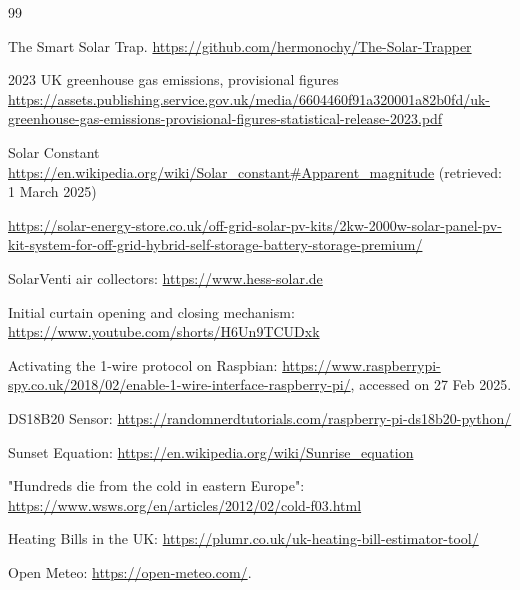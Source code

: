 \documentclass[a4paper,12pt]{article}
\begin{document}
\begin{thebibliography}{99}

     The Smart Solar Trap. \url{https://github.com/hermonochy/The-Solar-Trapper}

     2023 UK greenhouse gas emissions, provisional figures \url{https://assets.publishing.service.gov.uk/media/6604460f91a320001a82b0fd/uk-greenhouse-gas-emissions-provisional-figures-statistical-release-2023.pdf}

     Solar Constant \url{https://en.wikipedia.org/wiki/Solar\_constant\#Apparent\_magnitude} (retrieved: 1 March 2025)

     \url{https://solar-energy-store.co.uk/off-grid-solar-pv-kits/2kw-2000w-solar-panel-pv-kit-system-for-off-grid-hybrid-self-storage-battery-storage-premium/}

     SolarVenti air collectors: \url{https://www.hess-solar.de}

     Initial curtain opening and closing mechanism: \url{https://www.youtube.com/shorts/H6Un9TCUDxk}

     Activating the 1-wire protocol on Raspbian: 
        \url{https://www.raspberrypi-spy.co.uk/2018/02/enable-1-wire-interface-raspberry-pi/}, accessed on 27 Feb 2025.

     DS18B20 Sensor: \url{https://randomnerdtutorials.com/raspberry-pi-ds18b20-python/}

     Sunset Equation: \url{https://en.wikipedia.org/wiki/Sunrise_equation}

     "Hundreds die from the cold in eastern Europe": \url{https://www.wsws.org/en/articles/2012/02/cold-f03.html}

     Heating Bills in the UK: \url{https://plumr.co.uk/uk-heating-bill-estimator-tool/}

     Open Meteo: \url{https://open-meteo.com/}.
        
\end{thebibliography}
\end{document}
